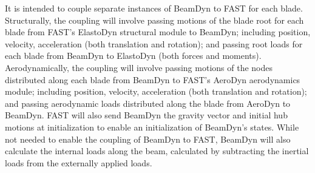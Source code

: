 \documentclass{aiaa-tc}
\begin{document}
It is intended to couple separate instances of BeamDyn to FAST for each blade.  Structurally, the coupling will involve passing motions of the blade root for each blade from FAST's ElastoDyn structural module to BeamDyn; including position, velocity, acceleration (both translation and rotation); and passing root loads for each blade from BeamDyn to ElastoDyn (both forces and moments).  Aerodynamically, the coupling will involve passing motions of the nodes distributed along each blade from BeamDyn to FAST's AeroDyn aerodynamics module; including position, velocity, acceleration (both translation and rotation); and passing aerodynamic loads distributed along the blade from AeroDyn to BeamDyn.  FAST will also send BeamDyn the gravity vector and initial hub motions at initialization to enable an initialization of BeamDyn's states.  While not needed to enable the coupling of BeamDyn to FAST, BeamDyn will also calculate the internal loads along the beam, calculated by subtracting the inertial loads from the externally applied loads.
\end{document}

